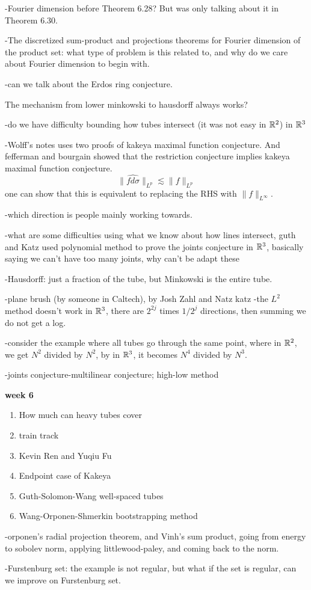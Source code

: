 -Fourier dimension before Theorem 6.28? But was only talking about it in Theorem 6.30.

-The discretized sum-product and projections theorems for Fourier dimension of the product set: what type of problem is this related to, and why do we care about Fourier dimension to begin with.

-can we talk about the Erdos ring conjecture.



The mechanism from lower minkowski to hausdorff always works?

-do we have difficulty bounding how tubes intersect (it was not easy in $\mathbb{R}^2$) in $\mathbb{R}^3$

-Wolff's notes uses two proofs of kakeya maximal function conjecture. And fefferman and bourgain showed that the restriction conjecture implies kakeya maximal function conjecture.
\begin{equation*}
    \|\widehat{fd\sigma}\|_{L^p}\lesssim \|f\|_{L^p}
\end{equation*}
one can show that this is equivalent to replacing the RHS with $\|f\|_{L^\infty}$.

-which direction is people mainly working towards.

-what are some difficulties using what we know about how lines intersect, guth and Katz used polynomial method to prove the joints conjecture in $\mathbb{R}^3$, basically saying we can't have too many joints, why can't be adapt these

-Hausdorff: just a fraction of the tube, but Minkowski is the entire tube.

-plane brush (by someone in Caltech), by Josh Zahl and Natz katz
-the $L^2$ method doesn't work
in $\mathbb{R}^3$, there are $2^{2j}$ times $1/2^{j}$ directions, then summing we do not get a log.

-consider the example where all tubes go through the same point, where in $\mathbb{R}^2$, we get $N^2$ divided by $N^2$, by in $\mathbb{R}^3$, it becomes $N^4$ divided by $N^3$.

-joints conjecture-multilinear conjecture; high-low method


\textbf{week 6}
\begin{enumerate}
    \item How much can heavy tubes cover
    \item train track
    \item Kevin Ren and Yuqiu Fu 
    \item Endpoint case of Kakeya
    \item Guth-Solomon-Wang well-spaced tubes
    \item Wang-Orponen-Shmerkin bootstrapping method
\end{enumerate}

-orponen's radial projection theorem, and Vinh's sum product, going from energy to sobolev norm, applying littlewood-paley, and coming back to the norm.

-Furstenburg set: the example is not regular, but what if the set is regular, can we improve on Furstenburg set.

